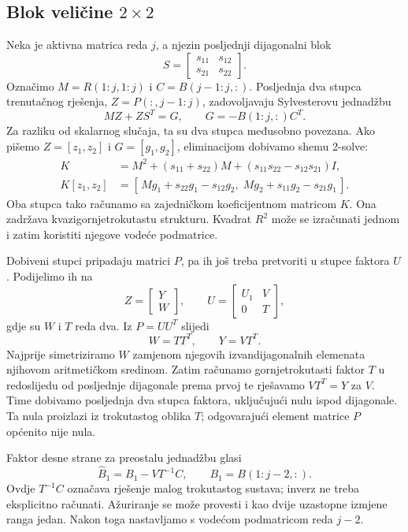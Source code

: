 \documentclass[12pt,a4paper]{article}
\begin{document}
\subsection{Blok veličine $2\times 2$}

Neka je aktivna matrica reda $j$, a njezin posljednji dijagonalni blok
\[
S = \begin{bmatrix} s_{11} & s_{12} \\ s_{21} & s_{22} \end{bmatrix}.
\]
Označimo $M = R(1{:}j,1{:}j)$ i $C = B(j{-}1{:}j,:)$. Posljednja dva stupca trenutačnog rješenja, $Z = P(:,j{-}1{:}j)$, zadovoljavaju Sylvesterovu jednadžbu
\[
MZ + ZS^{T} = G, \qquad G = -B(1{:}j,:)C^{T}.
\]
Za razliku od skalarnog slučaja, ta su dva stupca međusobno povezana. Ako pišemo $Z = [z_1,z_2]$ i $G = [g_1,g_2]$, eliminacijom dobivamo shemu 2-solve:
\begin{align*}
K &= M^2 + (s_{11}+s_{22})M + (s_{11}s_{22}-s_{12}s_{21})I, \\
K[z_1,z_2] &= [\,Mg_1+s_{22}g_1-s_{12}g_2,\;
Mg_2+s_{11}g_2-s_{21}g_1\,].
\end{align*}
Oba stupca tako računamo sa zajedničkom koeficijentnom matricom $K$. Ona zadržava kvazigornjetrokutastu strukturu. Kvadrat $R^2$ može se izračunati jednom i zatim koristiti njegove vodeće podmatrice.

Dobiveni stupci pripadaju matrici $P$, pa ih još treba pretvoriti u stupce faktora $U$. Podijelimo ih na
\[
Z = \begin{bmatrix} Y \\ W \end{bmatrix}, \qquad
U = \begin{bmatrix} U_1 & V \\ 0 & T \end{bmatrix},
\]
gdje su $W$ i $T$ reda dva. Iz $P = UU^{T}$ slijedi
\[
W = TT^{T}, \qquad Y = VT^{T}.
\]
Najprije simetriziramo $W$ zamjenom njegovih izvandijagonalnih elemenata njihovom aritmetičkom sredinom. Zatim računamo gornjetrokutasti faktor $T$ u redoslijedu od posljednje dijagonale prema prvoj te rješavamo $VT^{T} = Y$ za $V$. Time dobivamo posljednja dva stupca faktora, uključujući nulu ispod dijagonale. Ta nula proizlazi iz trokutastog oblika $T$; odgovarajući element matrice $P$ općenito nije nula.

Faktor desne strane za preostalu jednadžbu glasi
\[
\widehat{B}_1 = B_1 - VT^{-1}C, \qquad B_1 = B(1{:}j{-}2,:).
\]
Ovdje $T^{-1}C$ označava rješenje malog trokutastog sustava; inverz ne treba eksplicitno računati. Ažuriranje se može provesti i kao dvije uzastopne izmjene ranga jedan. Nakon toga nastavljamo s vodećom podmatricom reda $j-2$.
\end{document}
